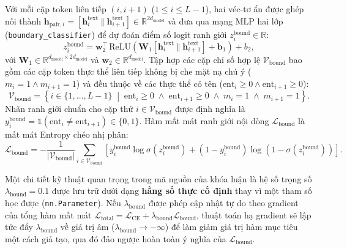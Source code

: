 Với mỗi cặp token liên tiếp $(i, i+1)$ ($1 \le i \le L-1$), hai véc-tơ ẩn được ghép nối thành $\mathbf{h}_{\text{pair}, i} = [\mathbf{h}_i^{\text{text}} \;\Vert\; \mathbf{h}_{i+1}^{\text{text}}] \in \mathbb{R}^{2 d_{\text{model}}}$ và đưa qua mạng MLP hai lớp (\texttt{boundary\_classifier}) để dự đoán điểm số logit ranh giới $z_i^{\text{bound}} \in \mathbb{R}$:
\begin{equation}
    \label{eq:boundary_mlp}
    z_i^{\text{bound}} = \mathbf{w}_2^\top \,\text{ReLU}\!\left( \mathbf{W}_1 \left[\mathbf{h}_i^{\text{text}} \;\Vert\; \mathbf{h}_{i+1}^{\text{text}}\right] + \mathbf{b}_1 \right) + b_2,
\end{equation}
với $\mathbf{W}_1 \in \mathbb{R}^{d_{\text{model}} \times 2 d_{\text{model}}}$ và $\mathbf{w}_2 \in \mathbb{R}^{d_{\text{model}}}$. Tập hợp các cặp chỉ số hợp lệ $\mathcal{V}_{\text{bound}}$ bao gồm các cặp token thực thể liên tiếp không bị che mặt nạ chú ý ($m_i = 1 \land m_{i+1} = 1$) và đều thuộc về các thực thể có tên ($\text{ent}_i \ge 0 \land \text{ent}_{i+1} \ge 0$):
\begin{equation}
    \mathcal{V}_{\text{bound}} = \left\{ i \in \{1, \dots, L-1\} \;\middle|\; \text{ent}_i \ge 0 \;\land\; \text{ent}_{i+1} \ge 0 \;\land\; m_i = 1 \;\land\; m_{i+1} = 1 \right\}.
\end{equation}
Nhãn ranh giới chuẩn cho cặp thứ $i \in \mathcal{V}_{\text{bound}}$ được định nghĩa là $y_i^{\text{bound}} = \mathds{1}(\text{ent}_i \neq \text{ent}_{i+1}) \in \{0, 1\}$. Hàm mất mát ranh giới nội dòng $\mathcal{L}_{\text{bound}}$ là mất mát Entropy chéo nhị phân:
\begin{equation}
    \label{eq:boundary_loss}
    \mathcal{L}_{\text{bound}} = -\frac{1}{|\mathcal{V}_{\text{bound}}|} \sum_{i \in \mathcal{V}_{\text{bound}}} \left[ y_i^{\text{bound}} \log \sigma\!\left(z_i^{\text{bound}}\right) + \left(1 - y_i^{\text{bound}}\right) \log \left(1 - \sigma\!\left(z_i^{\text{bound}}\right)\right) \right].
\end{equation}

Một chi tiết kỹ thuật quan trọng trong mã nguồn của khóa luận là hệ số trọng số $\lambda_{\text{bound}} = 0.1$ được lưu trữ dưới dạng \textbf{hằng số thực cố định} thay vì một tham số học được (\texttt{nn.Parameter}). Nếu $\lambda_{\text{bound}}$ được phép cập nhật tự do theo gradient của tổng hàm mất mát $\mathcal{L}_{\text{total}} = \mathcal{L}_{\text{CE}} + \lambda_{\text{bound}} \mathcal{L}_{\text{bound}}$, thuật toán hạ gradient sẽ lập tức đẩy $\lambda_{\text{bound}}$ về giá trị âm ($\lambda_{\text{bound}} \to -\infty$) để làm giảm giá trị hàm mục tiêu một cách giả tạo, qua đó đảo ngược hoàn toàn ý nghĩa của $\mathcal{L}_{\text{bound}}$.

